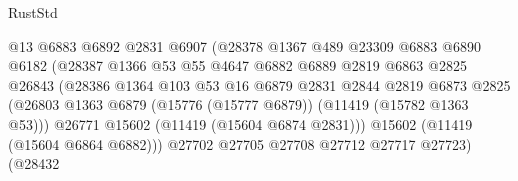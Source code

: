\begin{lexlean}{RustStd}
\begin{coremodule}
                                        @13
                                        @6883
                                        @6892
                                        @2831
                                        @6907
                                        (@28378
                                          @1367
                                          @489
                                          @23309
                                          @6883
                                          @6890
                                          @6182
                                          (@28387
                                            @1366
                                            @53
                                            @55
                                            @4647
                                            @6882
                                            @6889
                                            @2819
                                            @6863
                                            @2825
                                            @26843
                                            (@28386
                                              @1364
                                              @103
                                              @53
                                              @16
                                              @6879
                                              @2831
                                              @2844
                                              @2819
                                              @6873
                                              @2825
                                              (@26803
                                                @1363
                                                @6879
                                                (@15776 (@15777 @6879))
                                                (@11419 (@15782 @1363 @53)))
                                              @26771
                                              @15602
                                              (@11419 (@15604 @6874 @2831)))
                                            @15602
                                            (@11419 (@15604 @6864 @6882)))
                                          @27702
                                          @27705
                                          @27708
                                          @27712
                                          @27717
                                          @27723)
                                        (@28432

\end{coremodule}
\end{lexlean}
